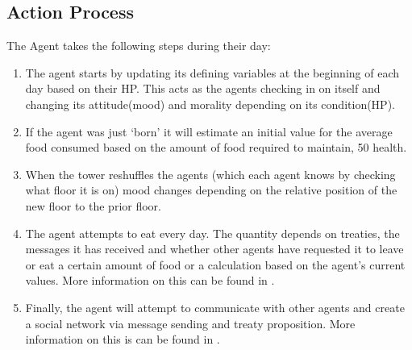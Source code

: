 \subsection{Action Process}
The Agent takes the following steps during their day: 
\begin{enumerate}
    \item The agent starts by updating its defining variables at the beginning of each day based on their HP. This acts as the agents checking in on itself and changing its attitude(mood) and morality depending on its condition(HP). 
    \item If the agent was just ‘born’ it will estimate an initial value for the average food consumed based on the amount of food required to maintain, 50 health.
    \item When the tower reshuffles the agents (which each agent knows by checking what floor it is on) mood changes depending on the relative position of the new floor to the prior floor.  
    \item The agent attempts to eat every day. The quantity depends on treaties, the messages it has received and whether other agents have requested it to leave or eat a certain amount of food or a calculation based on the agent’s current values. More information on this can be found in . 
    \item Finally, the agent will attempt to communicate with other agents and create a social network via message sending and treaty proposition. More information on this is can be found in . 
  \end{enumerate}

